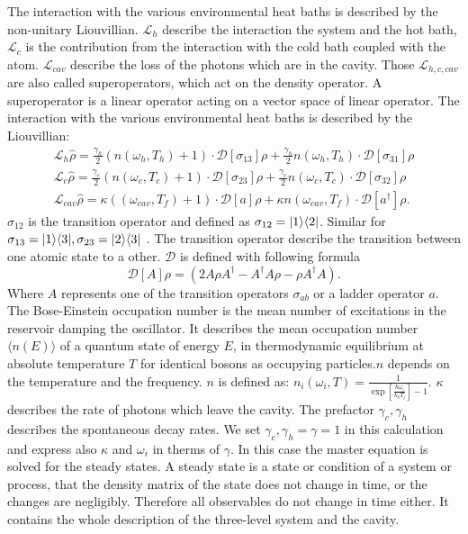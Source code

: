 \documentclass[12pt,a4paper]{article}
\DeclarePairedDelimiter\bra{\langle}{\rvert}
\DeclarePairedDelimiter\ket{\lvert}{\rangle}
\begin{document}
The interaction with the various environmental heat baths is described by the non-unitary Liouvillian. $\mathcal{L}_h$ describe the interaction the system and the hot bath, $\mathcal{L}_c$ is the contribution from the interaction with the cold bath coupled with the atom.  $\mathcal{L}_{cav}$ describe the loss of the photons which are in the cavity.  Those $\mathcal{L}_{h,c,cav}$ are also called superoperators, which act on the density operator.  A superoperator is a linear operator acting on a vector space of linear operator. 
The interaction with the various environmental heat baths is described by the Liouvillian:
\begin{equation}
\begin{aligned}
\mathcal{L}_h\hat{\rho}=\frac{\gamma_h}{2}(n(\omega_h,T_h)+1)   \cdot \mathcal{D}[\sigma_{13}]\rho
+\frac{\gamma_h}{2}n(\omega_h,T_h)\cdot \mathcal{D}[\sigma_{31}]\rho \\
\mathcal{L}_c\hat{\rho}=\frac{\gamma_c}{2}(n(\omega_c,T_c)+1)\cdot \mathcal{D}[\sigma_{23}]\rho
+\frac{\gamma_c}{2}n(\omega_c,T_c) \cdot \mathcal{D}[\sigma_{32}]\rho \\
\mathcal{L}_{cav}\hat{\rho}=\kappa((\omega_{cav},T_f)+1)	\cdot\mathcal{D}[a]\rho+
\kappa n(\omega_{cav},T_f)\cdot \mathcal{D}[a^{\dag}]\rho.
\end{aligned}
\end{equation}
$\sigma_{12} $ is the transition operator and defined as $ \sigma_{12}=\ket{1}\bra{2}$. Similar for $\sigma_{13}=\ket{1}\bra{3}, \sigma_{23}=\ket{2}\bra{3}$ . The transition operator describe the transition between one atomic state to a other.
$\mathcal{D}$ is defined with following formula
\begin{equation}
\mathcal{D}[A]\rho=(2A \rho	A^{\dag}-A^{\dag}A\rho-\rho A^{\dag}A).
\end{equation}
Where $A$ represents one of the transition operators $\sigma_{ab}$ or a ladder operator $a$.
The Bose-Einstein occupation number is the mean number of excitations in the reservoir damping the oscillator. It describes the mean occupation number $\langle n(E) \rangle$ of a quantum state of energy $E$, in thermodynamic equilibrium at absolute temperature $T $ for identical bosons as occupying particles.$ n$ depends on the temperature and the frequency.
$n$ is defined as:
$
n_i(\omega_i,T)=\frac{1}{\exp[\frac{\hbar \omega_i}{k_b T_i}]-1}.
$
$\kappa$ describes the rate of photons which leave the cavity.
The  prefactor $\gamma_c ,\gamma_h$ describes the spontaneous decay rates. We set $\gamma_c ,\gamma_h  =\gamma=1$ in this calculation and express also $\kappa$  and $\omega_i$ in  therms of  $\gamma$.
In this case the master equation is solved for the steady states.
A steady state is a state or condition of a system or process, that the density matrix of the state does not change in time, or the changes are negligibly. Therefore all observables do not change in time either. 
It contains the whole description of the three-level system and the cavity.
\end{document}
